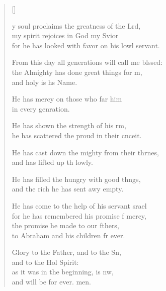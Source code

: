 \settowidth{\versewidth}{From this day all generations will call me blessed: +}
\begin{verse}[\versewidth]
  \begin{patverse}
y soul proclaims the greatness of the Lrd,\Flex\\
my spirit rejoices in God my Svior\Med\\
for he has looked with favor on his lowl servant.

From this day all generations will call me blssed:\Flex\\
the Almighty has done great things for m,\Med\\
and holy is h\pointup{\i}s Name.

He has mercy on those who far him\Med\\
in every genration.

He has shown the strength of his rm,\Med\\
he has scattered the proud in their cnceit.

He has cast down the mighty from their thrnes,\Med\\
and has lifted up th lowly.

He has filled the hungry with good thngs,\Med\\
and the rich he has sent awy empty.

He has come to the help of his servant srael\Med\\
for he has remembered his promise f mercy,\\
the promise he made to our fthers,\Med\\
to Abraham and his children fr ever.

Glory to the Father, and to the Sn,\Med\\
and to the Hol Spirit:\\
as it was in the beginning, is nw,\Med\\
and will be for ever. men.
  \end{patverse}
\end{verse}
